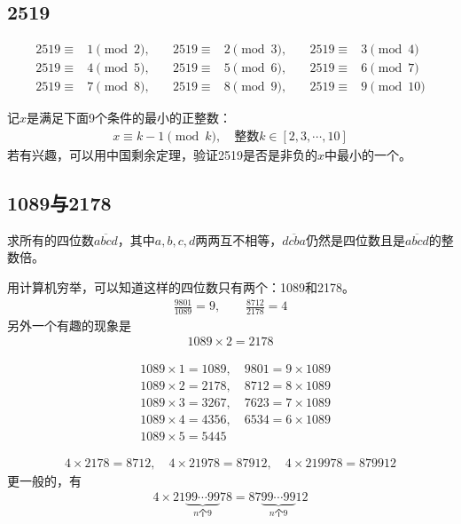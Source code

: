 \subsection{2519}
\label{sec:number-2519}

\begin{align*}
  2519 \equiv{}& 1\pmod2,\quad & 2519 \equiv{}& 2\pmod3,\quad & 2519 \equiv{}& 3\pmod4 \\
  2519 \equiv{}& 4\pmod5,\quad & 2519 \equiv{}& 5\pmod6,\quad & 2519 \equiv{}& 6\pmod7 \\
  2519 \equiv{}& 7\pmod8,\quad & 2519 \equiv{}& 8\pmod9,\quad & 2519 \equiv{}& 9\pmod{10}
\end{align*}

记$x$是满足下面9个条件的最小的正整数：
\begin{align*}
  x\equiv k-1\pmod k, \quad \text{整数}k\in[2,3,\cdots,10]
\end{align*}
若有兴趣，可以用中国剩余定理，验证2519是否是非负的$x$中最小的一个。

\subsection{1089与2178}
\label{sec:number-1089}

\begin{example}
  求所有的四位数$\overline{abcd}$，其中$a,b,c,d$两两互不相等，$\overline{dcba}$仍然是四位数且是$\overline{abcd}$的整数倍。
\end{example}
用计算机穷举，可以知道这样的四位数只有两个：1089和2178。
\begin{align*}
  \frac{9801}{1089} = 9, \quad\quad \frac{8712}{2178} = 4
\end{align*}
另外一个有趣的现象是
\begin{align*}
  1089 \times 2 = 2178
\end{align*}

\begin{align*}
  & 1089\times 1 = 1089, \quad 9801 = 9\times 1089\\
  & 1089\times 2 = 2178, \quad 8712 = 8\times 1089\\
  & 1089\times 3 = 3267, \quad 7623 = 7\times 1089\\
  & 1089\times 4 = 4356, \quad 6534 = 6\times 1089\\
  & 1089\times 5 = 5445
\end{align*}

\begin{align*}
   4\times 2178 = 8712,\quad 4\times 21978 = 87912,\quad 4\times 219978 = 879912
\end{align*}
更一般的，有
\begin{align*}
  4\times21\underbrace{99\cdots99}_{n\text{个}9}78 = 87\underbrace{99\cdots99}_{n\text{个}9}12
\end{align*}


